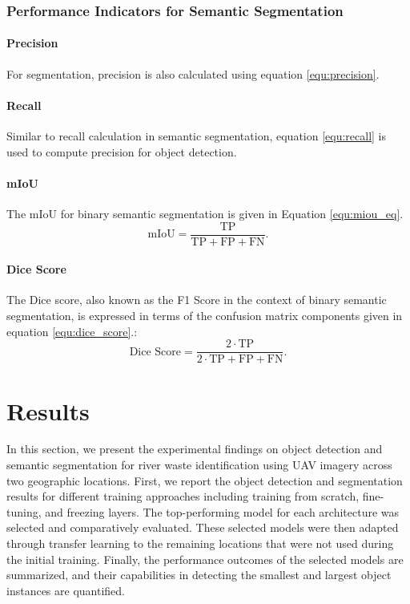 \documentclass{ieeeaccess}
\begin{document}
\vspace{0.3cm}
\subsubsection{Performance Indicators for Semantic Segmentation}
\vspace{0.1cm}
\paragraph{Precision}For segmentation, precision is also calculated using equation \ref{equ:precision}.
\vspace{0.1cm}

\paragraph{Recall}Similar to recall calculation in semantic segmentation, equation \ref{equ:recall} is used to compute precision for object detection.
\vspace{0.1cm}

\paragraph{mIoU}  The mIoU for binary semantic segmentation is given in Equation \ref{equ:miou_eq}. 
\begin{equation}     
    \text{mIoU} = \frac{\text{TP}}{\text{TP}+\text{FP}+\text{FN}} .
    \label{equ:miou_eq}
 \end{equation}
\vspace{0.1cm}

\paragraph{Dice Score} The Dice score, also known as the F1 Score in the context of binary semantic segmentation, is expressed in terms of the confusion matrix components given in equation \ref{equ:dice_score}.:
\begin{equation}   
\text{Dice Score} = \frac{2 \cdot \text{TP}}{2 \cdot \text{TP} + \text{FP} + \text{FN}} .
\label{equ:dice_score}
\end{equation}


\vspace{0.5cm}
\section{Results}
\label{sec:results}
In this section, we present the experimental findings on object detection and semantic segmentation for river waste identification using UAV imagery across two geographic locations. First, we report the object detection and segmentation results for different training approaches including training from scratch, fine-tuning, and freezing layers. The top-performing model for each architecture was selected and comparatively evaluated. These selected models were then adapted through transfer learning to the remaining locations that were not used during the initial training. Finally, the performance outcomes of the selected models are summarized, and their capabilities in detecting the smallest and largest object instances are quantified.
\end{document}
